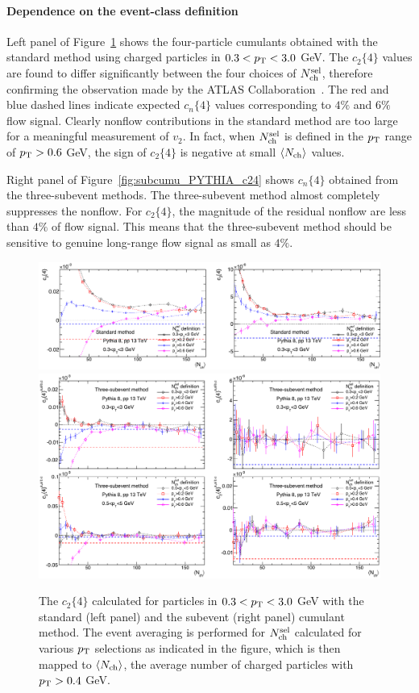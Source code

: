 \paragraph{Dependence on the event-class definition}

Left panel of Figure~\ref{fig:subcumu_PYTHIA_c24_pT0_X2} shows the four-particle cumulants obtained with the standard method using charged particles in $0.3<p_\text{T}<3.0$ GeV. The $c_2\{4\}$ values are found to differ significantly between the four choices of $N_\text{ch}^\text{sel}$, therefore confirming the observation made by the ATLAS Collaboration~\cite{Aaboud:2017acw}. The red and blue dashed lines indicate expected $c_n\{4\}$ values corresponding to $4\%$ and $6\%$ flow signal. Clearly nonflow contributions in the standard method are too large for a meaningful measurement of $v_2$. In fact, when $N_\text{ch}^\text{sel}$ is defined in the $p_\text{T}$ range of $p_\text{T}>0.6$ GeV, the sign of $c_2\{4\}$ is negative at small $\left\langle N_\text{ch}\right\rangle$ values.

Right panel of Figure~\ref{fig:subcumu_PYTHIA_c24} shows $c_n\{4\}$ obtained from the three-subevent methods. The three-subevent method almost completely suppresses the nonflow. For $c_2\{4\}$, the magnitude of the residual nonflow are less than $4\%$ of flow signal. This means that the three-subevent method should be sensitive to genuine long-range flow signal as small as $4\%$.

\begin{figure}[H]
\centering
\includegraphics[width=.475\linewidth]{figs/chapter_subcumu/PYTHIA_c24_pT0_std_X2}
\includegraphics[width=.475\linewidth]{figs/chapter_subcumu/PYTHIA_c24_pT0_sub_X2}
\caption{The $c_2\{4\}$ calculated for particles in $0.3<p_\text{T}<3.0$ GeV with the standard (left panel) and the subevent (right panel) cumulant method. The event averaging is performed for $N_\text{ch}^\text{sel}$ calculated for various $p_\text{T}$ selections as indicated in the figure, which is then mapped to $\left\langle N_\text{ch}\right\rangle$, the average number of charged particles with $p_\text{T}>0.4$ GeV.}
\label{fig:subcumu_PYTHIA_c24_pT0_X2}
\end{figure}



